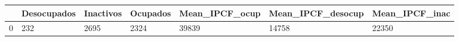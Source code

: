 \begin{tabular}{lllllll}
\toprule
{} & Desocupados & Inactivos & Ocupados & Mean\_IPCF\_ocup & Mean\_IPCF\_desocup & Mean\_IPCF\_inac \\
\midrule
0 &         232 &      2695 &     2324 &          39839 &             14758 &          22350 \\
\bottomrule
\end{tabular}
